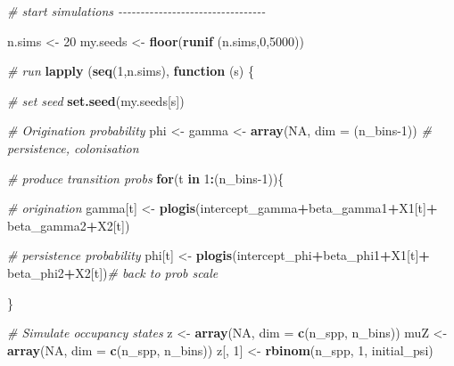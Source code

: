 \documentclass[
]{article}
\newenvironment{Shaded}{\begin{snugshade}}{\end{snugshade}}
\newcommand{\AttributeTok}[1]{\textcolor[rgb]{0.13,0.29,0.53}{#1}}
\newcommand{\CommentTok}[1]{\textcolor[rgb]{0.56,0.35,0.01}{\textit{#1}}}
\newcommand{\ConstantTok}[1]{\textcolor[rgb]{0.56,0.35,0.01}{#1}}
\newcommand{\ControlFlowTok}[1]{\textcolor[rgb]{0.13,0.29,0.53}{\textbf{#1}}}
\newcommand{\DecValTok}[1]{\textcolor[rgb]{0.00,0.00,0.81}{#1}}
\newcommand{\FunctionTok}[1]{\textcolor[rgb]{0.13,0.29,0.53}{\textbf{#1}}}
\newcommand{\NormalTok}[1]{#1}
\newcommand{\OtherTok}[1]{\textcolor[rgb]{0.56,0.35,0.01}{#1}}
\newcommand{\SpecialCharTok}[1]{\textcolor[rgb]{0.81,0.36,0.00}{\textbf{#1}}}
\begin{document}
{\begin{Shaded}
\begin{Highlighting}[]
\CommentTok{\# start simulations {-}{-}{-}{-}{-}{-}{-}{-}{-}{-}{-}{-}{-}{-}{-}{-}{-}{-}{-}{-}{-}{-}{-}{-}{-}{-}{-}{-}{-}{-}{-}{-}{-}}

\NormalTok{n.sims }\OtherTok{\textless{}{-}} \DecValTok{20}
\NormalTok{my.seeds }\OtherTok{\textless{}{-}} \FunctionTok{floor}\NormalTok{(}\FunctionTok{runif}\NormalTok{ (n.sims,}\DecValTok{0}\NormalTok{,}\DecValTok{5000}\NormalTok{))}

\CommentTok{\# run}
\FunctionTok{lapply}\NormalTok{ (}\FunctionTok{seq}\NormalTok{(}\DecValTok{1}\NormalTok{,n.sims), }\ControlFlowTok{function}\NormalTok{ (s) \{}
  
        \CommentTok{\# set seed}
        \FunctionTok{set.seed}\NormalTok{(my.seeds[s])}
        
        \CommentTok{\# Origination probability}
\NormalTok{        phi }\OtherTok{\textless{}{-}}\NormalTok{ gamma }\OtherTok{\textless{}{-}} \FunctionTok{array}\NormalTok{(}\ConstantTok{NA}\NormalTok{, }\AttributeTok{dim =}\NormalTok{ (n\_bins}\DecValTok{{-}1}\NormalTok{)) }\CommentTok{\# persistence, colonisation}
         
        \CommentTok{\# produce transition probs}
        \ControlFlowTok{for}\NormalTok{(t }\ControlFlowTok{in} \DecValTok{1}\SpecialCharTok{:}\NormalTok{(n\_bins}\DecValTok{{-}1}\NormalTok{))\{}
          
            \CommentTok{\# origination }
\NormalTok{            gamma[t] }\OtherTok{\textless{}{-}} \FunctionTok{plogis}\NormalTok{(intercept\_gamma}\SpecialCharTok{+}\NormalTok{beta\_gamma1}\SpecialCharTok{+}\NormalTok{X1[t]}\SpecialCharTok{+}
\NormalTok{                                      beta\_gamma2}\SpecialCharTok{+}\NormalTok{X2[t])}
            
            \CommentTok{\# persistence probability}
\NormalTok{            phi[t] }\OtherTok{\textless{}{-}} \FunctionTok{plogis}\NormalTok{(intercept\_phi}\SpecialCharTok{+}\NormalTok{beta\_phi1}\SpecialCharTok{+}\NormalTok{X1[t]}\SpecialCharTok{+}
\NormalTok{                                    beta\_phi2}\SpecialCharTok{+}\NormalTok{X2[t])}\CommentTok{\# back to prob scale}
            
            
\NormalTok{        \}}
        
        \CommentTok{\# Simulate occupancy states}
\NormalTok{        z }\OtherTok{\textless{}{-}} \FunctionTok{array}\NormalTok{(}\ConstantTok{NA}\NormalTok{, }\AttributeTok{dim =} \FunctionTok{c}\NormalTok{(n\_spp, n\_bins))}
\NormalTok{        muZ }\OtherTok{\textless{}{-}} \FunctionTok{array}\NormalTok{(}\ConstantTok{NA}\NormalTok{, }\AttributeTok{dim =} \FunctionTok{c}\NormalTok{(n\_spp, n\_bins))}
\NormalTok{        z[, }\DecValTok{1}\NormalTok{] }\OtherTok{\textless{}{-}} \FunctionTok{rbinom}\NormalTok{(n\_spp, }\DecValTok{1}\NormalTok{, initial\_psi)}
        

\end{Highlighting}
\end{Shaded}}
\end{document}
